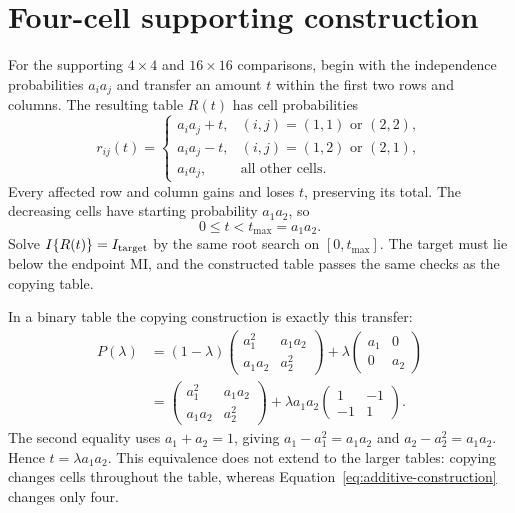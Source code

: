 \section{Four-cell supporting construction}

For the supporting \(4\times4\) and \(16\times16\) comparisons,
begin with the independence probabilities \(a_i a_j\) and transfer
an amount \(t\) within the first two rows and columns. The resulting
table \(R(t)\) has cell probabilities
\begin{equation}
 r_{ij}(t)=
 \begin{cases}
 a_i a_j+t,&(i,j)=(1,1)\text{ or }(2,2),\\
 a_i a_j-t,&(i,j)=(1,2)\text{ or }(2,1),\\
 a_i a_j,&\text{all other cells}.
 \end{cases}
 \label{eq:additive-construction}
\end{equation}
Every affected row and column gains and loses \(t\), preserving its
total. The decreasing cells have starting probability \(a_1a_2\), so
\begin{equation}
 0\leq t<t_{\max}=a_1a_2.
 \label{eq:design-tmax}
\end{equation}
Solve \(I\{R(t)\}=I_{\rm target}\) by the same root search on
\([0,t_{\max}]\). The target must lie below the endpoint MI, and the
constructed table passes the same checks as the copying table.

In a binary table the copying construction is exactly this transfer:
\begin{align}
 P(\lambda)
 &=(1-\lambda)
 \begin{pmatrix}a_1^2&a_1a_2\\a_1a_2&a_2^2\end{pmatrix}
 +\lambda\begin{pmatrix}a_1&0\\0&a_2\end{pmatrix}\\
 &=\begin{pmatrix}a_1^2&a_1a_2\\a_1a_2&a_2^2\end{pmatrix}
   +\lambda a_1a_2\begin{pmatrix}1&-1\\-1&1\end{pmatrix}.
 \label{eq:binary-copy-equivalence}
\end{align}
The second equality uses \(a_1+a_2=1\), giving
\(a_1-a_1^2=a_1a_2\) and \(a_2-a_2^2=a_1a_2\).
Hence \(t=\lambda a_1a_2\). This equivalence does not extend to the
larger tables: copying changes cells throughout the table, whereas
Equation~\eqref{eq:additive-construction} changes only four.

